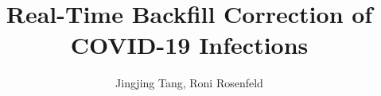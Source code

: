 \documentclass{article}
\title{Real-Time Backfill Correction of COVID-19 Infections
}
\author{Jingjing Tang, Roni Rosenfeld}
\begin{document}

\maketitle

\begin{abstract}


\end{abstract}









\clearpage

\printbibliography
\end{document}
